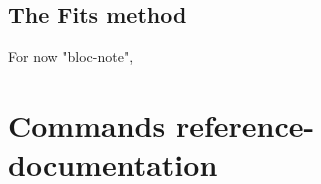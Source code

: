 


























\COM
{
\chapter{The Fits method}

For now "bloc-note",

}


\part{Commands reference-documentation}







